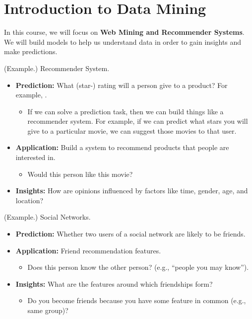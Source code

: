 \documentclass[letterpaper]{article}
\begin{document}
\section{Introduction to Data Mining}
In this course, we will focus on \textbf{Web Mining and Recommender Systems}. We will build models to help us understand data in order to gain insights and make predictions.

\begin{mdframed}[]
    (Example.) Recommender System. 
    \begin{itemize}
        \item \textbf{Prediction:} What (star-) rating will a person give to a product? For example, .
        \begin{itemize}
            \item If we can solve a prediction task, then we can build things like a recommender system. For example, if we can predict what stars you will give to a particular movie, we can suggest those movies to that user.
        \end{itemize}
        \item \textbf{Application:} Build a system to recommend products that people are interested in. 
        \begin{itemize}
            \item Would this person like this movie? 
        \end{itemize}
        \item \textbf{Insights:} How are opinions influenced by factors like time, gender, age, and location?
    \end{itemize}
\end{mdframed}

\begin{mdframed}[]
    (Example.) Social Networks.
    \begin{itemize}
        \item \textbf{Prediction:} Whether two users of a social network are likely to be friends.
        \item \textbf{Application:} Friend recommendation features. 
        \begin{itemize}
            \item Does this person know the other person? (e.g., ``people you may know'').
        \end{itemize}
        \item \textbf{Insights:} What are the features around which friendships form? 
        \begin{itemize}
            \item Do you become friends because you have some feature in common (e.g., same group)? 
        \end{itemize}
    \end{itemize}
\end{mdframed}
\end{document}
